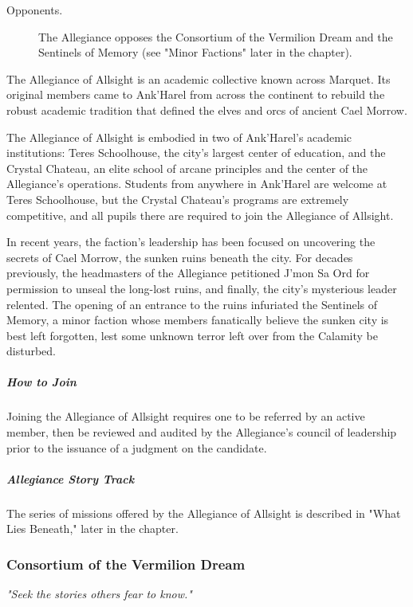 \documentclass[10pt,a4paper,twoside,fancy,bg=print,twocolumn,openany,nodeprecatedcode]{dndbook}
\begin{document}
\begin{description}
\item[Opponents.]
The Allegiance opposes the Consortium of the Vermilion Dream and the Sentinels of Memory (see "Minor Factions" later in the chapter).
\end{description}

The Allegiance of Allsight is an academic collective known across Marquet. Its original members came to Ank'Harel from across the continent to rebuild the robust academic tradition that defined the elves and orcs of ancient Cael Morrow.

The Allegiance of Allsight is embodied in two of Ank'Harel's academic institutions: Teres Schoolhouse, the city's largest center of education, and the Crystal Chateau, an elite school of arcane principles and the center of the Allegiance's operations. Students from anywhere in Ank'Harel are welcome at Teres Schoolhouse, but the Crystal Chateau's programs are extremely competitive, and all pupils there are required to join the Allegiance of Allsight.

In recent years, the faction's leadership has been focused on uncovering the secrets of Cael Morrow, the sunken ruins beneath the city. For decades previously, the headmasters of the Allegiance petitioned J'mon Sa Ord for permission to unseal the long-lost ruins, and finally, the city's mysterious leader relented. The opening of an entrance to the ruins infuriated the Sentinels of Memory, a minor faction whose members fanatically believe the sunken city is best left forgotten, lest some unknown terror left over from the Calamity be disturbed.

\subparagraph{How to Join}
Joining the Allegiance of Allsight requires one to be referred by an active member, then be reviewed and audited by the Allegiance's council of leadership prior to the issuance of a judgment on the candidate.

\subparagraph{Allegiance Story Track}
The series of missions offered by the Allegiance of Allsight is described in "What Lies Beneath," later in the chapter.

\subsubsection{Consortium of the Vermilion Dream}
\textit{"Seek the stories others fear to know."}
\end{document}
